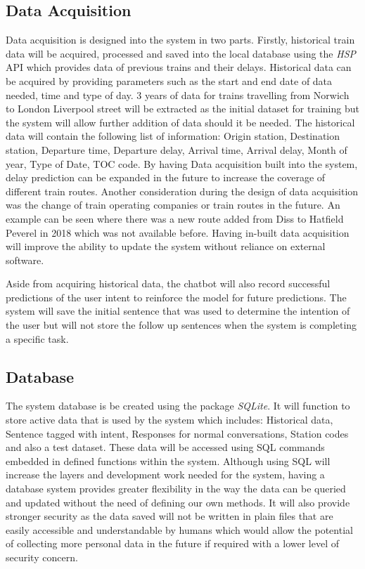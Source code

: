 \documentclass[11pt]{article}
\begin{document}
\subsection{Data Acquisition}
Data acquisition is designed into the system in two parts. Firstly, historical train data will be acquired, processed and saved into the local database using the \textit{HSP} API which provides data of previous trains and their delays. Historical data can be acquired by providing parameters such as the start and end date of data needed, time and type of day. 3 years of data for trains travelling from Norwich to London Liverpool street will be extracted as the initial dataset for training but the system will allow further addition of data should it be needed. The historical data will contain the following list of information: Origin station, Destination station, Departure time, Departure delay, Arrival time, Arrival delay, Month of year, Type of Date, TOC code. By having Data acquisition built into the system, delay prediction can be expanded in the future to increase the coverage of different train routes. Another consideration during the design of data acquisition was the change of train operating companies or train routes in the future. An example can be seen where there was a new route added from Diss to Hatfield Peverel in 2018 which was not available before. Having in-built data acquisition will improve the ability to update the system without reliance on external software.

Aside from acquiring historical data, the chatbot will also record successful predictions of the user intent to reinforce the model for future predictions. The system will save the initial sentence that was used to determine the intention of the user but will not store the follow up sentences when the system is completing a specific task.

\subsection{Database}
The system database is be created using the package \textit{SQLite}. It will function to store active data that is used by the system which includes: Historical data, Sentence tagged with intent, Responses for normal conversations, Station codes and also a test dataset. These data will be accessed using SQL commands embedded in defined functions within the system. Although using SQL will increase the layers and development work needed for the system, having a database system provides greater flexibility in the way the data can be queried and updated without the need of defining our own methods. It will also provide stronger security as the data saved will not be written in plain files that are easily accessible and understandable by humans which would allow the potential of collecting more personal data in the future if required with a lower level of security concern.
\end{document}
